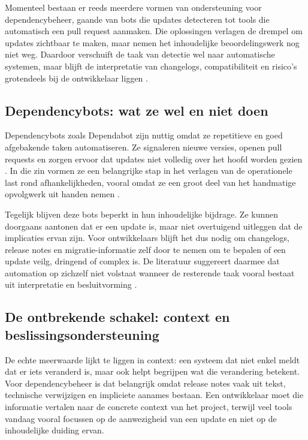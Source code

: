 Momenteel bestaan er reeds meerdere vormen van ondersteuning voor dependencybeheer, gaande van bots die updates detecteren tot tools die automatisch een pull request aanmaken. Die oplossingen verlagen de drempel om updates zichtbaar te maken, maar nemen het inhoudelijke beoordelingswerk nog niet weg. Daardoor verschuift de taak van detectie wel naar automatische systemen, maar blijft de interpretatie van changelogs, compatibiliteit en risico's grotendeels bij de ontwikkelaar liggen \textcite{Erlenhov2022,Pashchenko2018}.

\subsection{Dependencybots: wat ze wel en niet doen}

Dependencybots zoals Dependabot zijn nuttig omdat ze repetitieve en goed afgebakende taken automatiseren. Ze signaleren nieuwe versies, openen pull requests en zorgen ervoor dat updates niet volledig over het hoofd worden gezien \textcite{Hassan2023}. In die zin vormen ze een belangrijke stap in het verlagen van de operationele last rond afhankelijkheden, vooral omdat ze een groot deel van het handmatige opvolgwerk uit handen nemen \textcite{Hassan2023}.

Tegelijk blijven deze bots beperkt in hun inhoudelijke bijdrage. Ze kunnen doorgaans aantonen dat er een update is, maar niet overtuigend uitleggen dat de implicaties ervan zijn. Voor ontwikkelaars blijft het dus nodig om changelogs, release notes en migratie-informatie zelf door te nemen om te bepalen of een update veilg, dringend of complex is. De literatuur suggereert daarmee dat automation op zichzelf niet volstaat wanneer de resterende taak vooral bestaat uit interpretatie en besluitvorming \textcite{Erlenhov2022}.

\subsection{De ontbrekende schakel: context en beslissingsondersteuning}

De echte meerwaarde lijkt te liggen in context: een systeem dat niet enkel meldt dat er iets veranderd is, maar ook helpt begrijpen wat die verandering betekent. Voor dependencybeheer is dat belangrijk omdat release notes vaak uit tekst, technische verwijzigen en impliciete aanames bestaan. Een ontwikkelaar moet die informatie vertalen naar de concrete context van het project, terwijl veel tools vandaag vooral focussen op de aanwezigheid van een update en niet op de inhoudelijke duiding ervan.

